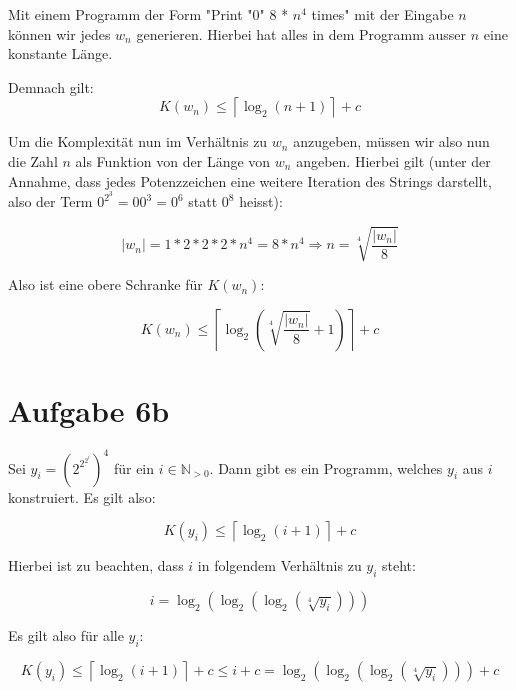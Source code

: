 \documentclass[a4paper]{article}
\begin{document}
	Mit einem Programm der Form "Print "0" 8 * $n^4$ times" mit der Eingabe $n$ können wir jedes $w_n$ generieren.
	Hierbei hat alles in dem Programm ausser $n$ eine konstante Länge.

	Demnach gilt:
	\[K(w_n) \leq \left \lceil{\log_2(n+1)}\right \rceil + c \]

	Um die Komplexität nun im Verhältnis zu $w_n$ anzugeben, müssen wir also nun die Zahl $n$ als Funktion von der Länge von $w_n$ angeben.
	Hierbei gilt (unter der Annahme, dass jedes Potenzzeichen eine weitere Iteration des Strings darstellt, also der Term $0^{2^3} = 00^3 = 0^6$ statt $0^8$ heisst):

	\[\lvert w_n \rvert = 1 * 2 * 2 * 2 * n^4 = 8 * n^4 \Rightarrow n = \sqrt[4]{\frac{\lvert w_n \rvert}{8}}\]

	Also ist eine obere Schranke für $K(w_n)$:

	\[K(w_n) \leq \left \lceil{\log_2({\sqrt[4]{\frac{\lvert w_n \rvert}{8}}} + 1)}\right \rceil + c\]

\section{Aufgabe 6b}

	Sei $y_i = (2^{2^{2^i}})^4$ für ein $i \in \mathbb{N}_{>0}$. Dann gibt es ein Programm, welches $y_i$ aus $i$ konstruiert. Es gilt also:

	\[K(y_i) \leq \left \lceil{\log_2(i+1)}\right \rceil + c \]

	Hierbei ist zu beachten, dass $i$ in folgendem Verhältnis zu $y_i$ steht:
	
	\[i = \log_2(\log_2(\log_2(\sqrt[4]{y_i}))) \]

	Es gilt also für alle $y_i$:

	\[K(y_i) \leq \left \lceil{\log_2(i+1)}\right \rceil + c \leq i + c = \log_2(\log_2(\log_2(\sqrt[4]{y_i}))) + c \]
	 
\end{document}

